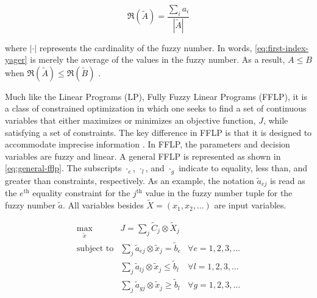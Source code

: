 \documentclass[ee,thesis]{usuthesis}
\begin{document}
\begin{equation}
\label{eq:first-index-yager}
\mathfrak{R}(\tilde{A}) = \frac{\sum_i a_i}{|\tilde{A}|}
\end{equation}

\noindent where \(|\cdot|\) represents the cardinality of the fuzzy number. In words, \ref{eq:first-index-yager} is merely the
average of the values in the fuzzy number. As a result, \(A \le B\) when \(\mathfrak{R}(\tilde{A}) \le \mathfrak{R}(\tilde{B})\)
\cite{bello-2019-fuzzy-activ}.

\label{sec:fully-fuzzy-linear-programming}

Much like the Linear Programs (LP), Fully Fuzzy Linear Programs (FFLP), it is a class of constrained optimization in
which one seeks to find a set of continuous variables that either maximizes or minimizes an objective function, \(J\),
while satisfying a set of constraints. The key difference in FFLP is that it is designed to accommodate imprecise
information \cite{bello-2019-fuzzy-activ,kaur-2016-introd-fuzzy}. In FFLP, the parameters and decision variables are
fuzzy and linear. A general FFLP is represented as shown in \ref{eq:general-fflp}. The subscripts \(\cdot_e\), \(\cdot_l\), and \(\cdot_g\)
indicate to equality, less than, and greater than constraints, respectively. As an example, the notation
\(\tilde{a}_{ej}\) is read as the \(e^{\text{th}}\) equality constraint for the \(j^{\text{th}}\) value in the fuzzy number
tuple for the fuzzy number \(\tilde{a}\). All variables besides \(\tilde{X} = (x_1, x_2, ...)\) are input variables.

\begin{equation}
\label{eq:general-fflp}
\begin{array}{lll}
\underset{{\tilde{x}}}{\text{max}} & J = \sum_j \tilde{C}_j \otimes \tilde{X}_j              &                 \\
\text{subject to}                  & \sum_j \tilde{a}_{ej} \otimes \tilde{x}_j = \tilde{b}_e &  \forall e = 1,2,3,... \\
                                   & \sum_j \tilde{a}_{lj} \otimes \tilde{x}_j \le \tilde{b}_l &  \forall l = 1,2,3,... \\
                                   & \sum_j \tilde{a}_{gj} \otimes \tilde{x}_j \ge \tilde{b}_l &  \forall g = 1,2,3,...
\end{array}
\end{equation}
\end{document}
